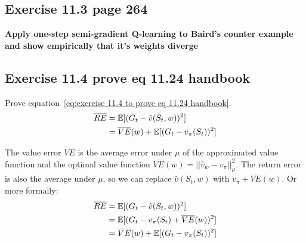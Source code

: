 \subsection{Exercise 11.3 page 264}
\textbf{Apply one-step semi-gradient Q-learning to Baird's counter example and show empirically that it's weights diverge}

\subsection{Exercise 11.4 prove eq 11.24 handbook}
Prove equation~\ref{eq:exercise 11.4 to prove eq 11.24 handbook}.
\begin{equation}
\begin{split}
\overline{RE} & = \operatorname{\mathbb{E}}[(G_t - \hat{v}(S_t, w))^2] \\
& = \overline{VE}(w) + \operatorname{\mathbb{E}}[(G_t-v_{\pi}(S_t))^2] \\
\end{split}
\label{eq:exercise 11.4 to prove eq 11.24 handbook}
\end{equation}

The value error $\overline{VE}$ is the average error under $\mu$ of the approximated value function and the optimal value function $\overline{VE}(w) = || \hat{v}_w - v_\pi ||_{\mu}^2$. The return error is also the average under $\mu$, so we can replace $\hat{v}(S_t, w)$ with $v_\pi + \overline{VE}(w)$. Or more formally:
\begin{equation}
\begin{split}
\overline{RE} & = \operatorname{\mathbb{E}}[(G_t - \hat{v}(S_t, w))^2] \\
& = \operatorname{\mathbb{E}}[(G_t-v_{\pi}(S_t)+\overline{VE}(w))^2] \\
& = \overline{VE}(w) + \operatorname{\mathbb{E}}[(G_t-v_{\pi}(S_t))^2] \\
\end{split}
\label{eq:exercise 11.4 solution}
\end{equation}
